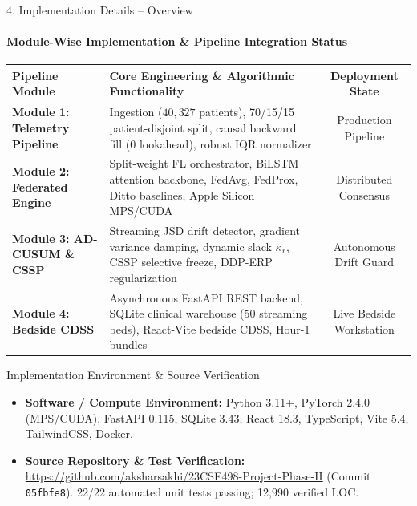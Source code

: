 \documentclass[aspectratio=169, 11pt]{beamer}
\begin{document}
\begin{frame}{4. Implementation Details -- Overview}
    \framesubtitle{Module-Wise Implementation \& Pipeline Integration Status}
    \begin{table}
        \centering
        \scriptsize
        \renewcommand{\arraystretch}{0.96}
        \begin{tabular}{p{3.4cm} p{7.0cm} c}
            \toprule
            \textbf{Pipeline Module} & \textbf{Core Engineering \& Algorithmic Functionality} & \textbf{Deployment State} \\
            \midrule
            \textbf{Module 1: Telemetry Pipeline} & Ingestion ($40,327$ patients), 70/15/15 patient-disjoint split, causal backward fill (0 lookahead), robust IQR normalizer & Production Pipeline \\
            \textbf{Module 2: Federated Engine} & Split-weight FL orchestrator, BiLSTM attention backbone, FedAvg, FedProx, Ditto baselines, Apple Silicon MPS/CUDA & Distributed Consensus \\
            \textbf{Module 3: AD-CUSUM \& CSSP} & Streaming JSD drift detector, gradient variance damping, dynamic slack $\kappa_r$, CSSP selective freeze, DDP-ERP regularization & Autonomous Drift Guard \\
            \textbf{Module 4: Bedside CDSS} & Asynchronous FastAPI REST backend, SQLite clinical warehouse ($50$ streaming beds), React-Vite bedside CDSS, Hour-1 bundles & Live Bedside Workstation \\
            \bottomrule
        \end{tabular}
    \end{table}
    \vspace{-0.06cm}

    \begin{block}{Implementation Environment \& Source Verification}
        \scriptsize
        \begin{itemize}
            \item \textbf{Software / Compute Environment:} Python 3.11+, PyTorch 2.4.0 (MPS/CUDA), FastAPI 0.115, SQLite 3.43, React 18.3, TypeScript, Vite 5.4, TailwindCSS, Docker.
            \item \textbf{Source Repository \& Test Verification:} \url{https://github.com/aksharsakhi/23CSE498-Project-Phase-II} (Commit \texttt{05fbfe8}). 22/22 automated unit tests passing; 12,990 verified LOC.
        \end{itemize}
    \end{block}
\end{frame}
\end{document}
